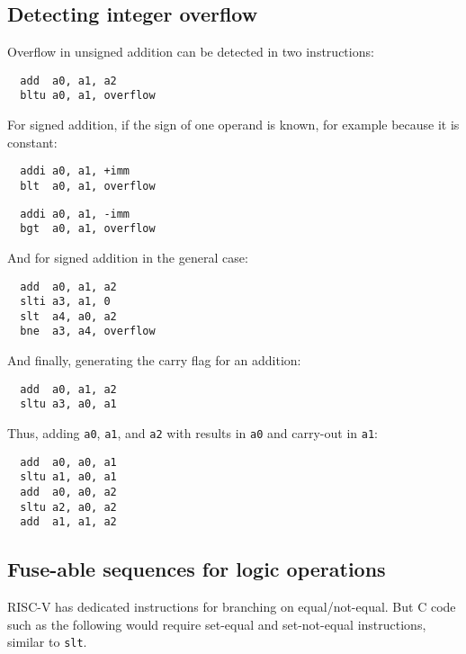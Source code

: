 
\subsection{Detecting integer overflow}

Overflow in unsigned addition can be detected in two instructions:

\begin{verbatim}
  add  a0, a1, a2
  bltu a0, a1, overflow
\end{verbatim}

For signed addition, if the sign of one operand is known, for example
because it is constant:

\begin{verbatim}
  addi a0, a1, +imm
  blt  a0, a1, overflow
\end{verbatim}

\begin{verbatim}
  addi a0, a1, -imm
  bgt  a0, a1, overflow
\end{verbatim}

And for signed addition in the general case:

\begin{verbatim}
  add  a0, a1, a2
  slti a3, a1, 0
  slt  a4, a0, a2
  bne  a3, a4, overflow
\end{verbatim}

And finally, generating the carry flag for an addition:

\begin{verbatim}
  add  a0, a1, a2
  sltu a3, a0, a1
\end{verbatim}

Thus, adding {\tt a0}, {\tt a1}, and {\tt a2} with results in {\tt a0} and carry-out in {\tt a1}:

\begin{verbatim}
  add  a0, a0, a1
  sltu a1, a0, a1
  add  a0, a0, a2
  sltu a2, a0, a2
  add  a1, a1, a2
\end{verbatim}


\subsection{Fuse-able sequences for logic operations}

RISC-V has dedicated instructions for branching on equal/not-equal. But C code
such as the following would require set-equal and set-not-equal instructions, similar
to {\tt slt}.

